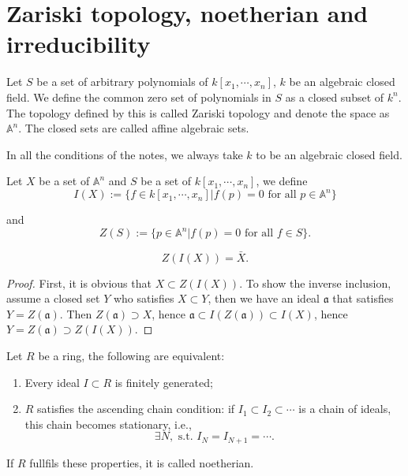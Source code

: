 \section{Zariski topology, noetherian and irreducibility}
\begin{definition}
	Let $S$ be a set of arbitrary polynomials of $k[x_1,\cdots,x_n]$, $k$ be an algebraic closed field. We define the common zero set of polynomials in $S$ as a closed subset of $k^n$. The topology defined by this is called Zariski topology and denote the space as $ \mathbb{A}^n$. The closed sets are called affine algebraic sets.
\end{definition}
\begin{remark}
	In all the conditions of the notes, we always take $k$ to be an algebraic closed field.
\end{remark}

\begin{definition}
	Let $ { X }$ be a set of $ { \mathbb{A}^n }$ and $ { S }$ be a set of $ { k[x_1,\cdots,x_n] }$, we define
	$$  I(X):=\{ f\in k[x_1,\cdots,x_n]| f(p)=0 \text{ for all } p\in \mathbb{A}^n \} $$

	and
	$$ Z(S):=\{ p\in\mathbb{A}^n| f(p)=0 \text{ for all } f\in S \}. $$
\end{definition}
\begin{proposition}
	$$ Z(I(X)) = \bar{X}. $$
\end{proposition}
\begin{proof}
	First, it is obvious that $ { X \subset Z(I(X)) }$. To show the inverse inclusion, assume a closed set $ { Y }$ who satisfies $ { X\subset Y }$, then we have an ideal $ { \mathfrak{a} }$ that satisfies $ { Y=Z(\mathfrak{a}) }$. Then $ { Z(\mathfrak{a})\supset X }$, hence $ { \mathfrak{a}\subset I(Z(\mathfrak{a}))\subset I(X) }$, hence $ { Y=Z(\mathfrak{a})\supset Z(I(X))}$.
\end{proof}

\begin{proposition}
	Let $R$ be a ring, the following are equivalent:
	\begin{enumerate}
		\item Every ideal $I\subset R$ is finitely generated;
		\item $R$ satisfies the ascending chain condition: if $I_1\subset I_2\subset \cdots $ is a chain of ideals, this chain becomes stationary, i.e.,
		      $$
			      \exists N, \text{ s.t. } I_N=I_{N+1}=\cdots .
		      $$
	\end{enumerate}
	If $R$ fullfils these properties, it is called noetherian.
\end{proposition}

